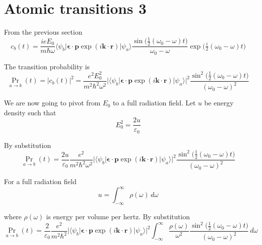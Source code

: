

\section*{Atomic transitions 3}

From the previous section
\begin{equation*}
c_b(t)=\frac{ieE_0}{m\hbar\omega}
\langle\psi_b|\boldsymbol{\epsilon}\cdot\mathbf p\exp(i\mathbf k\cdot\mathbf r)|\psi_a\rangle
\frac{\sin\bigl(\tfrac{1}{2}(\omega_0-\omega)t\bigr)}{\omega_0-\omega}
\exp\bigl(\tfrac{i}{2}(\omega_0-\omega)t\bigr)
\end{equation*}

The transition probability is
\begin{equation*}
\Pr_{a\rightarrow b}(t)=|c_b(t)|^2
=\frac{e^2E_0^2}{m^2\hbar^2\omega^2}
\bigl|\langle\psi_b|\boldsymbol{\epsilon}\cdot\mathbf p\exp(i\mathbf k\cdot\mathbf r)|\psi_a\rangle\bigr|^2
\frac{\sin^2\bigl(\tfrac{1}{2}(\omega_0-\omega)t\bigr)}{(\omega_0-\omega)^2}
\end{equation*}

We are now going to pivot from $E_0$ to a full radiation field.
Let $u$ be energy density such that
\begin{equation*}
E_0^2=\frac{2u}{\varepsilon_0}
\end{equation*}

By substitution
\begin{equation*}
\Pr_{a\rightarrow b}(t)
=\frac{2u}{\varepsilon_0}
\frac{e^2}{m^2\hbar^2\omega^2}
\bigl|\langle\psi_b|\boldsymbol{\epsilon}\cdot\mathbf p\exp(i\mathbf k\cdot\mathbf r)|\psi_a\rangle\bigr|^2
\frac{\sin^2\bigl(\tfrac{1}{2}(\omega_0-\omega)t\bigr)}{(\omega_0-\omega)^2}
\end{equation*}

For a full radiation field
\begin{equation*}
u=\int_{-\infty}^\infty\rho(\omega)\,d\omega
\end{equation*}

where $\rho(\omega)$ is energy per volume per hertz.
By substitution
\begin{equation*}
\Pr_{a\rightarrow b}(t)
=\frac{2}{\varepsilon_0}
\frac{e^2}{m^2\hbar^2}
\bigl|\langle\psi_b|\boldsymbol{\epsilon}\cdot\mathbf p\exp(i\mathbf k\cdot\mathbf r)|\psi_a\rangle\bigr|^2
\int_{-\infty}^\infty
\frac{\rho(\omega)}{\omega^2}
\frac{\sin^2\bigl(\tfrac{1}{2}(\omega_0-\omega)t\bigr)}{(\omega_0-\omega)^2}\,d\omega
\end{equation*}

